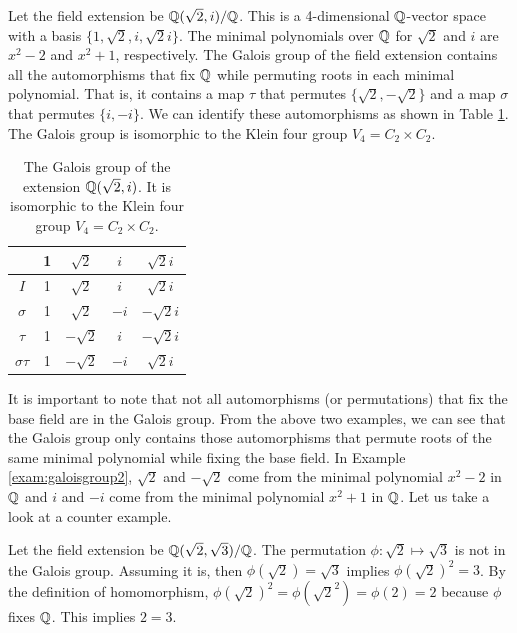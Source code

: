 \documentclass[../main.tex]{subfiles}
\begin{document}
\begin{example}
\label{exam:galoisgroup2}
Let the field extension be $\mathbb{Q}(\sqrt{2},i)/\mathbb{Q}$. This is a 4-dimensional $\mathbb{Q}$-vector space with a basis $\{1,\sqrt{2},i,\sqrt{2}i\}$. The minimal polynomials over $\mathbb{Q}$ for $\sqrt{2}$ and $i$ are $x^2-2$ and $x^2+1$, respectively. The Galois group of the field extension contains all the automorphisms that fix $\mathbb{Q}$ while permuting roots in each minimal polynomial. That is, it contains a map $\tau$ that permutes $\{\sqrt{2},-\sqrt{2}\}$ and a map $\sigma$ that permutes $\{i,-i\}$.
We can identify these automorphisms as shown in Table \ref{tab:galoisgroup}. The Galois group is isomorphic to the Klein four group $V_4 = C_2 \times C_2$. 
\begin{table}[h!]
\centering
\begin{tabular}{|c|c|c|c|c|}
\hline
 & 1 & $\sqrt{2}$ & $i$ & $\sqrt{2}i$ \\ \hline
$I$ & 1 & $\sqrt{2}$ & $i$ & $\sqrt{2}i$  \\ \hline
$\sigma$ & 1 & $\sqrt{2}$ & $-i$ & $-\sqrt{2}i$ \\ \hline
$\tau$ & 1 & $-\sqrt{2}$ & $i$ & $-\sqrt{2}i$ \\ \hline
$\sigma \tau$ & 1 & $-\sqrt{2}$ & $-i$ & $\sqrt{2}i$ \\ \hline
\end{tabular}
\caption{The Galois group of the extension $\mathbb{Q}(\sqrt{2},i)$. It is isomorphic to the Klein four group $V_4=C_2\times C_2$.}
\label{tab:galoisgroup}
\end{table}
\end{example}

It is important to note that not all automorphisms (or permutations) that fix the base field are in the Galois group. From the above two examples, we can see that the Galois group only contains those automorphisms that permute roots of the same minimal polynomial while fixing the base field. In Example \ref{exam:galoisgroup2}, $\sqrt{2}$ and $-\sqrt{2}$ come from the minimal polynomial $x^2-2$ in $\mathbb{Q}$ and $i$ and $-i$ come from the minimal polynomial $x^2+1$ in $\mathbb{Q}$. Let us take a look at a counter example. 

\begin{example}
Let the field extension be $\mathbb{Q}(\sqrt{2},\sqrt{3})/\mathbb{Q}$. The permutation $\phi:\sqrt{2} \mapsto \sqrt{3}$ is not in the Galois group. Assuming it is, then $\phi(\sqrt{2}) = \sqrt{3}$ implies $\phi(\sqrt{2})^2 = 3$. By the definition of homomorphism, $\phi(\sqrt{2})^2 = \phi(\sqrt{2}^2)=\phi(2)=2$ because $\phi$ fixes $\mathbb{Q}$. This implies $2=3$. 
\end{example}
\end{document}
